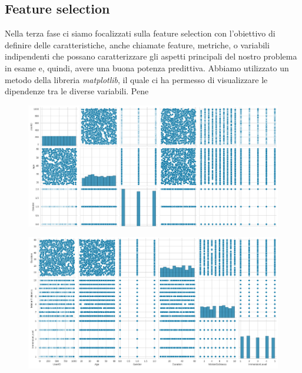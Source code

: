 \label{paragrafo 3.3}
\newpage
\subsection{Feature selection}
Nella terza fase ci siamo focalizzati sulla feature selection con l’obiettivo di definire delle caratteristiche, anche chiamate feature, metriche, o variabili indipendenti che possano caratterizzare gli aspetti principali del nostro problema in esame e, quindi, avere una buona potenza predittiva. Abbiamo utilizzato un metodo della libreria \textit{matplotlib}, il quale ci ha permesso di visualizzare le dipendenze tra le diverse variabili.
Pene

\begin{figure}[h]
    \centering
    \includegraphics[width=\textwidth]{MetaClassAI_Documentazione/3/img/FeatureSelection_1.png}
\end{figure}
\begin{figure}[h]
    \centering
    \includegraphics[width=\textwidth]{MetaClassAI_Documentazione/3/img/FeatureSelection_2.png}
\end{figure}